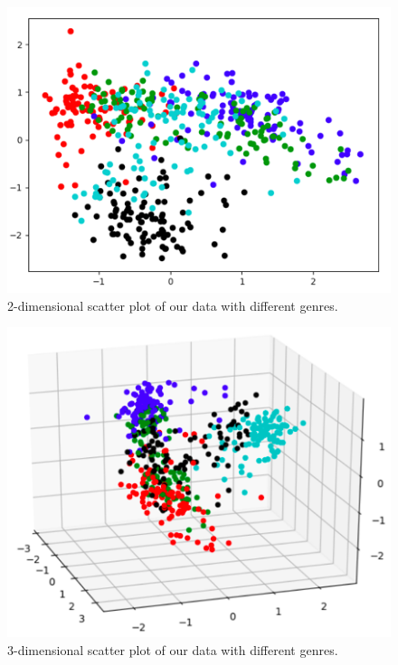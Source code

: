 \begin{figure}
\begin{center}
\includegraphics[scale=0.3]{./figures/2_d_plot.png}
\end{center}
\caption
{
2-dimensional scatter plot of our data with different genres. 
}
\label{fig:big_picture5}
\end{figure}

\begin{figure}
\begin{center}
\includegraphics[scale=0.3]{./figures/3_d_plot.png}
\end{center}
\caption
{
3-dimensional scatter plot of our data with different genres. 
}
\label{fig:big_picture5}
\end{figure}

